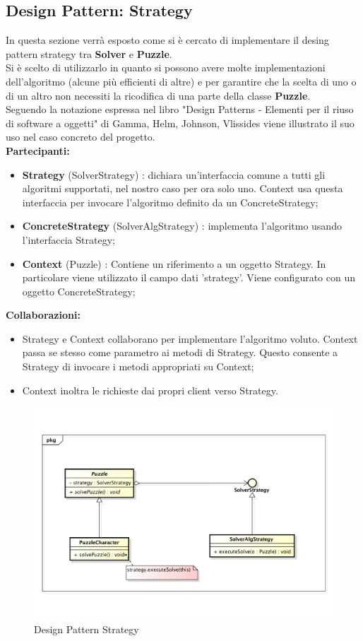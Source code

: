 	\subsection{Design Pattern: Strategy} \label{DPS}
In questa sezione verrà esposto come si è cercato di implementare il desing pattern strategy tra \textbf{Solver} e \textbf{Puzzle}. \\
Si è scelto di utilizzarlo in quanto si possono avere molte implementazioni dell'algoritmo (alcune più efficienti di altre) e per garantire che la scelta di uno o di un altro non necessiti la ricodifica di una parte della classe \textbf{Puzzle}. \\
Seguendo la notazione espressa nel libro "Design Patterns - Elementi per il riuso di software a oggetti" di Gamma, Helm, Johnson, Vlissides viene illustrato il suo uso nel caso concreto del progetto. \\
\textbf{Partecipanti:}
		\begin{itemize}
			\item \textbf{Strategy} (SolverStrategy) :  dichiara un'interfaccia comune a tutti gli algoritmi supportati, nel nostro caso per ora solo uno. Context usa questa interfaccia per invocare l'algoritmo definito da un ConcreteStrategy;
			\item \textbf{ConcreteStrategy} (SolverAlgStrategy) : implementa l'algoritmo usando l'interfaccia Strategy;
			\item \textbf{Context} (Puzzle) : Contiene un riferimento a un oggetto Strategy. In particolare viene utilizzato il campo dati 'strategy'. Viene configurato con un oggetto ConcreteStrategy; \\
		\end{itemize}
\noindent
\textbf{Collaborazioni:}
		\begin{itemize}
			\item Strategy e Context collaborano per implementare l'algoritmo voluto. Context passa se stesso come parametro ai metodi di Strategy. Questo consente a Strategy di invocare i metodi appropriati su Context;
			\item Context inoltra le richieste dai propri client verso Strategy.
		\end{itemize}
\noindent
	\begin{figure}[htbp]
		\centering
		\includegraphics[width=15cm]{img/DesignPatternStrategy.pdf}
		\caption{Design Pattern Strategy}
		\label{Design Pattern Strategy}
	\end{figure}



